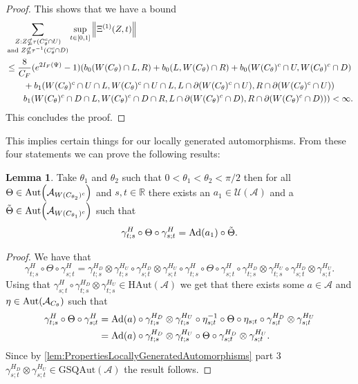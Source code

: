 \documentclass[12pt,a4paper,twoside]{article}
\let\originalleft\left
\let\originalright\right
\renewcommand{\left}{\mathopen{}\mathclose\bgroup\originalleft}
\renewcommand{\right}{\aftergroup\egroup\originalright}
\newcommand{\UU}{\mathcal U}
\renewcommand{\AA}{\mathcal A}
\newcommand{\RR}{\mathbb R}
\newcommand{\Ad}[1]{\textrm{Ad}\left(#1\right)}
\newcommand{\Aut}[1]{\textrm{Aut}\left(#1\right)}
\theoremstyle{definition}
\newtheorem{lemma}[theorem]{Lemma}
\numberwithin{equation}{section}
\begin{document}
\begin{proof}
	This shows that we have a bound
	\begin{align}
		&\sum_{\substack{Z:Z\nsubseteq \tau(C_\theta^c\cap U)\\\text{and }Z\nsubseteq \tau^{-1}(C_\theta^c\cap D)}}\sup_{t\in[0,1]}\norm{\Xi^{(1)}(Z,t)}\\
		\nonumber
		&\leq \frac{8}{C_F}(e^{2I_F(\Psi)}-1)(b_0(W(C_\theta)\cap L,R)+b_0(L,W(C_\theta)\cap R)+b_0(W(C_\theta)^c\cap U,W(C_\theta)^c\cap D)\\
		\nonumber
		&\qquad+b_1(W(C_\theta)^c\cap U\cap L,W(C_\theta)^c\cap U\cap L,L\cap\partial(W(C_\theta)^c\cap U),R\cap\partial(W(C_\theta)^c\cap U))\\
		&\qquad b_1(W(C_\theta)^c\cap D\cap L,W(C_\theta)^c\cap D\cap R,L\cap\partial(W(C_\theta)^c\cap D),R\cap\partial(W(C_\theta)^c\cap D)))<\infty.
	\end{align}
	This concludes the proof.
\end{proof}
This implies certain things for our locally generated automorphisms.
From these four statements we can prove the following results:
\begin{lemma}\label{lem:TwoAngleLemmaPart1}
	Take $\theta_1$ and $\theta_2$ such that $0<\theta_1<\theta_2<\pi/2$ then for all $\Theta\in\Aut{\AA_{W(C_{\theta_2})^c}}$ and $s,t\in\RR$ there exists an $a_1\in\UU(\AA)$ and a $\tilde{\Theta}\in \Aut{\AA_{W(C_{\theta_1})^c}}$ such that
		\begin{equation}\label{eq:TwoAngleLemmaPart1Equation1}
			\gamma^{H}_{t;s}\circ\Theta\circ\gamma^{H}_{s;t}=\Ad{a_1}\circ\tilde{\Theta}.
		\end{equation}
\end{lemma}
\begin{proof}
	We have that
	\begin{equation}
		\gamma^{H}_{t;s}\circ\Theta\circ\gamma^{H}_{s;t}=\gamma^{H_D}_{t;s}\otimes\gamma^{H_U}_{t;s}\circ\gamma^{H_D}_{s;t}\otimes\gamma^{H_U}_{s;t}\circ\gamma^{H}_{t;s}\circ\Theta\circ\gamma^{H}_{s;t}\circ\gamma^{H_D}_{t;s}\otimes\gamma^{H_U}_{t;s}\circ\gamma^{H_D}_{s;t}\otimes\gamma^{H_U}_{s;t}.
	\end{equation}
	Using that $\gamma^{H}_{s;t}\circ\gamma^{H_D}_{t;s}\otimes\gamma^{H_U}_{t;s}\in\textrm{HAut}(\AA)$ we get that there exists some $a\in\AA$ and $\eta\in\Aut{\AA_{C_\theta}}$ such that
	\begin{align}
		\gamma^{H}_{t;s}\circ\Theta\circ\gamma^{H}_{s;t}&=\Ad{a}\circ \gamma^{H_D}_{t;s}\otimes\gamma^{H_U}_{t;s}\circ\eta_{s;t}^{-1}\circ\Theta\circ\eta_{s;t}\circ\gamma^{H_D}_{s;t}\otimes\gamma^{H_U}_{s;t}\\
		&=\Ad{a}\circ \gamma^{H_D}_{t;s}\otimes\gamma^{H_U}_{t;s}\circ\Theta\circ\gamma^{H_D}_{s;t}\otimes\gamma^{H_U}_{s;t}.
	\end{align}
	Since by \ref{lem:PropertiesLocallyGeneratedAutomorphisms} part 3 $\gamma^{H_D}_{s;t}\otimes\gamma^{H_U}_{s;t}\in\textrm{GSQAut}(\AA)$ the result follows.
\end{proof}
\end{document}
